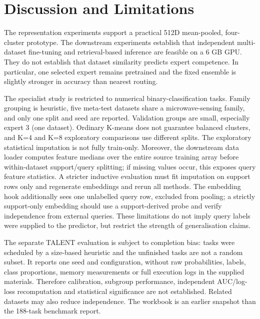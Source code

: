 \documentclass[conference]{IEEEtran}
\begin{document}
\section{Discussion and Limitations}
The representation experiments support a practical 512D mean-pooled, four-cluster prototype. The downstream experiments establish that independent multi-dataset fine-tuning and retrieval-based inference are feasible on a 6 GB GPU. They do not establish that dataset similarity predicts expert competence. In particular, one selected expert remains pretrained and the fixed ensemble is slightly stronger in accuracy than nearest routing.

The specialist study is restricted to numerical binary-classification tasks. Family grouping is heuristic, five meta-test datasets share a microwave-sensing family, and only one split and seed are reported. Validation groups are small, especially expert 3 (one dataset). Ordinary K-means does not guarantee balanced clusters, and K=4 and K=8 exploratory comparisons use different splits. The exploratory statistical imputation is not fully train-only. Moreover, the downstream data loader computes feature medians over the entire source training array before within-dataset support/query splitting; if missing values occur, this exposes query feature statistics. A stricter inductive evaluation must fit imputation on support rows only and regenerate embeddings and rerun all methods. The embedding hook additionally sees one unlabelled query row, excluded from pooling; a strictly support-only embedding should use a support-derived probe and verify independence from external queries. These limitations do not imply query labels were supplied to the predictor, but restrict the strength of generalisation claims.

The separate TALENT evaluation is subject to completion bias: tasks were scheduled by a size-based heuristic and the unfinished tasks are not a random subset. It reports one seed and configuration, without raw probabilities, labels, class proportions, memory measurements or full execution logs in the supplied materials. Therefore calibration, subgroup performance, independent AUC/log-loss recomputation and statistical significance are not established. Related datasets may also reduce independence. The workbook is an earlier snapshot than the 188-task benchmark report.
\end{document}
